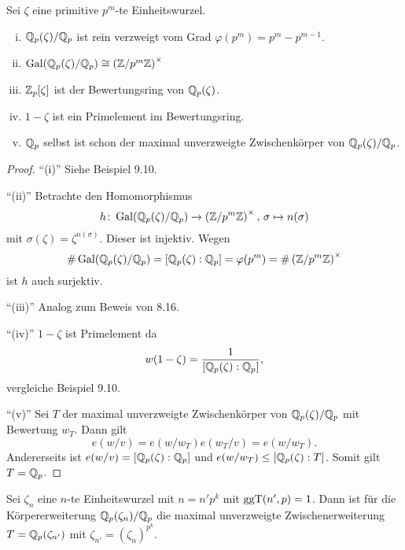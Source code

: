 

\begin{Prop}
	Sei $\zeta$ eine primitive $p^m$-te Einheitswurzel.
	\begin{enumerate}[(i)]
		\item $\mathbb{Q}_p(\zeta)/\mathbb{Q}_p$ ist rein verzweigt vom Grad $\varphi(p^m) = p^m - p^{m-1}$.
		\item $\operatorname{Gal} (\mathbb{Q}_p(\zeta)/\mathbb{Q}_p) \cong \left( \mathbb{Z} / p^m \mathbb{Z} \right)^\times$
		\item $\mathbb{Z}_p[\zeta]$ ist der Bewertungsring von $\mathbb{Q}_p(\zeta)$.
		\item $1-\zeta$ ist ein Primelement im Bewertungsring.
		\item $\mathbb{Q}_p$ selbst ist schon der maximal unverzweigte Zwischenkörper von $\mathbb{Q}_p(\zeta) / \mathbb{Q}_p$.
	\end{enumerate}
\end{Prop}


\begin{proof}
	\enquote{(i)} Siehe Beispiel 9.10.
	
	\bigskip \enquote{(ii)} Betrachte den Homomorphismus
	\[ h \colon \operatorname{Gal} (\mathbb{Q}_p(\zeta)/\mathbb{Q}_p) \to \left( \mathbb{Z} / p^m \mathbb{Z} \right)^\times, \, \sigma \mapsto n(\sigma)
	\]
	mit $\sigma(\zeta) = \zeta^{n(\sigma)}$. Dieser ist injektiv. Wegen
	\[ \# \operatorname{Gal} (\mathbb{Q}_p(\zeta)/\mathbb{Q}_p) = [\mathbb{Q}_p(\zeta):\mathbb{Q}_p] 
	=\varphi(p^m) = \# \left( \mathbb{Z} / p^m \mathbb{Z} \right)^\times
	\]
	ist $h$ auch surjektiv.
	
	\bigskip \enquote{(iii)} Analog zum Beweis von 8.16.
	
	\bigskip \enquote{(iv)} $1-\zeta$ ist Primelement da
	\[ w(1-\zeta) = \frac{1}{[\mathbb{Q}_p(\zeta):\mathbb{Q}_p]},
	\]
	vergleiche Beispiel 9.10.
	
	\bigskip \enquote{(v)} Sei $T$ der maximal unverzweigte Zwischenkörper von $\mathbb{Q}_p(\zeta) / \mathbb{Q}_p$ mit Bewertung $w_T$. Dann gilt
	\[ e(w/v) = e(w/w_T)e(w_T/v)=e(w/w_T).
	\]
	Andererseits ist $e(w/v) = [\mathbb{Q}_p(\zeta):\mathbb{Q}_p]$ und $e(w/w_T) \leq [\mathbb{Q}_p(\zeta):T]$.
	Somit gilt $T=\mathbb{Q}_p$.
\end{proof}


\begin{Bsp}
	Sei $\zeta_n$ eine $n$-te Einheitswurzel mit $n=n'p^k$ mit $\operatorname{ggT}(n',p) = 1$.
	Dann ist für die Körpererweiterung $\mathbb{Q}_p(\zeta_n) / \mathbb{Q}_p$ die maximal unverzweigte Zwischenerweiterung $T=\mathbb{Q}_p(\zeta_{n'})$ mit $\zeta_{n'} = (\zeta_n)^{p^k}$.
\end{Bsp}

